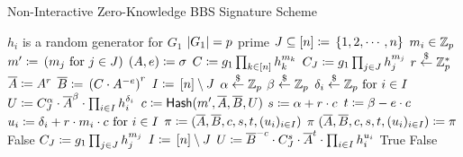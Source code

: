 \begin{algorithm}[p]
\caption{Non-Interactive Zero-Knowledge BBS Signature Scheme}
\label{alg:nizk_bbs}
\begin{algorithmic}[1]
\Require $h_{i}$ is a random generator for $G_{1}$
\Require $\left| G_{1} \right| = p$ prime
\Require $J \subseteq \left[ n \right] \coloneqq{} \left\{ 1, 2, \cdots, n \right\}$
\Require $m_{i}\in \mathbb{Z}_{p}$
    \State $m^{\prime} \coloneqq{} \left( m_{j} \text{ for } j\in J \right)$
    \State $\left( A,e \right) \coloneqq{} \sigma$
    \State $C     \coloneqq{} g_{1} \prod_{k\in\left[ n \right]}h_{k}^{m_{k}}$
    \State $C_{J} \coloneqq{} g_{1} \prod_{j\in J}h_{j}^{m_{j}}$
    \State $r \stackrel{\$}{\leftarrow}{} \mathbb{Z}_{p}^{*}$
    \State $\overline{A} \coloneqq{} A^{r}$
    \State $\overline{B} \coloneqq{} \left( C\cdot A^{-e} \right)^{r}$
    \State $I \coloneqq{} \left[ n \right] \setminus J$
    \State $\alpha \stackrel{\$}{\leftarrow}{} \mathbb{Z}_{p}$
    \State $\beta \stackrel{\$}{\leftarrow}{} \mathbb{Z}_{p}$
    \State $\delta_{i} \stackrel{\$}{\leftarrow}{} \mathbb{Z}_{p} \text{ for } i\in I$
    \State $U \coloneqq{} C_{J}^{\alpha}\cdot\overline{A}^{\beta}\cdot
            \prod_{i\in I}h_{i}^{\delta_{i}}$
    \State $c \coloneqq{}
        \textsf{Hash}(m^{\prime}, \overline{A}, \overline{B}, U)$
    \State $s \coloneqq{} \alpha + r\cdot c$
    \State $t \coloneqq{} \beta - e\cdot c$
    \State $u_{i} \coloneqq{} \delta_{i} + r\cdot m_{i}\cdot c \text{ for } i\in I$
    \State $\pi \coloneqq{} (\overline{A}, \overline{B}, c, s, t, (u_{i})_{i\in I})$
    \State \Return $\pi$
\EndProcedure
\State
{}
    \State $(\overline{A}, \overline{B}, c, s, t, (u_{i})_{i\in I})
        \coloneqq{} \pi$
        \State \Return \textsf{False}
    \EndIf
    \State $C_{J} \coloneqq{} g_{1} \prod_{j\in J}h_{j}^{m_{j}}$
    \State $I \coloneqq{} \left[ n \right] \setminus J$
    \State $U \coloneqq{}
        \overline{B}^{-c}\cdot C_{J}^{s}\cdot\overline{A}^{t}\cdot
        \prod_{i\in I}h_{i}^{u_{i}}$
        \State \Return \textsf{True}
    \Else
        \State \Return \textsf{False}
    \EndIf
\EndProcedure
\end{algorithmic}
\end{algorithm}
